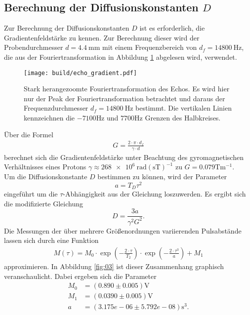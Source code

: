 \subsection{Berechnung der Diffusionskonstanten $D$}
\noindent Zur Berechnung der Diffusionskonstanten $D$ ist es erforderlich, die
Gradientenfeldstärke zu kennen. Zur Berechnung dieser wird der Probendurchmesser
$d = \SI{4.4}{\milli\meter}$ mit einem Frequenzbereich von $d_f = \SI{14800}{\hertz}$, die aus der Fouriertransformation in Abbildung \ref{fig:d_f} abgelesen wird, verwendet.
\begin{figure}
  \texttt{[image: build/echo\_gradient.pdf]}
  \caption{Stark herangezoomte Fouriertransformation des Echos. Es wird hier nur der Peak der Fouriertransformation betrachtet und daraus der Frequenzdurchmesser $d_f = \SI{14800}{\hertz}$ bestimmt. Die vertikalen Linien kennzeichnen die $-7100\si{\hertz}$ und $7700\si{\hertz}$ Grenzen des Halbkreises.}
  \label{fig:d_f}
\end{figure}
Über die Formel
\begin{align}
  G = \frac{2 \cdot \pi \cdot d_f}{\gamma \cdot d}
  \label{eqn:05}
\end{align}
\noindent berechnet sich die Gradientenfeldstärke unter Beachtung des
gyromagnetischen Verhältnisses eines Protons $\gamma \approx \num{268e6} \:
\text{rad}(\si{\second\tesla})^{-1}$ zu
$G = \num{0.079} {\si{\tesla}}{\si{\meter}^{-1}}$. \\
\noindent Um die Diffusionskonstante $D$ bestimmen zu können, wird der Parameter
\begin{equation}
  a = T_D \tau^2
\end{equation}
eingeführt um die $\tau$-Abhängigkeit aus der Gleichung \label{diffusion_constant} loszuwerden.
Es ergibt sich die modifizierte Gleichung
\begin{equation}
  D = \frac{3a}{\gamma^2 G^2}.
  \label{eqn:diffusion_modifiziert}
\end{equation}
Die Messungen der über mehrere
Größenordnungen variierenden Pulsabstände lassen sich durch eine Funktion
\begin{align}
  M(\tau) = M_0 \cdot \exp{\left(- \frac{2 \cdot \tau}{T_2}\right)} \cdot \exp{\left(- \frac{2 \cdot \tau^3}{a}\right)} + M_1
 \label{eqn:06}
\end{align}
\noindent approximieren. In Abbildung \ref{fig:03} ist dieser Zusammenhang
graphisch veranschaulicht. Dabei ergeben sich die Parameter
\begin{align*}
  M_0 &=  (0.890  \pm  0.005)          \si{\volt} \\
  M_1 &=  (0.0390  \pm  0.005)         \si{\volt} \\
  a &=  (3.175e-06  \pm  5.792e-08) \si{\second^3}.
\end{align*}
